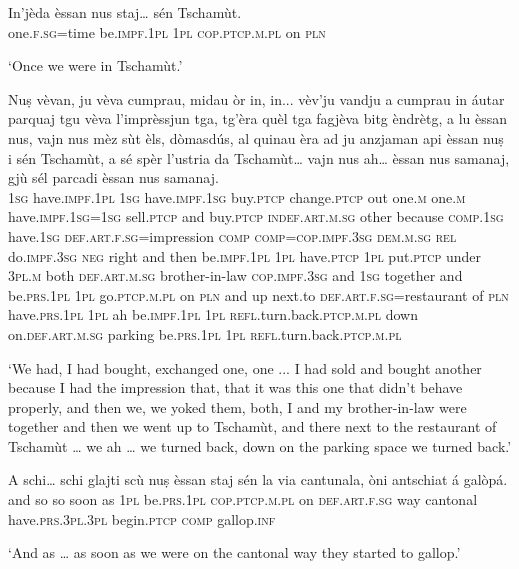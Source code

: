 \begin{linenumbers}
\gll   In’jèda èssan nus staj… sén Tschamùt. \\
 one.\textsc{f.sg=}time be.\textsc{impf.1pl} \textsc{1pl} \textsc{cop.ptcp.m.pl} on \textsc{pln} \\
\end{linenumbers}
\medskip
\glt `Once we were in Tschamùt.'
\medskip

\begin{linenumbers}
\gll Nuṣ vèvan, ju vèva cumprau, midau òr in, in... vèv’ju vandju a cumprau in áutar parquaj tgu vèva l’imprèssjun tga, tg’èra quèl tga fagjèva bitg èndrètg, a lu èssan nus, vajn nus mèz sùt èls, dòmasdús, al quinau èra ad ju anzjaman api èssan nuṣ i sén Tschamùt, a sé spèr l’ustria da Tschamùt… vajn nus ah… èssan nus samanaj, gjù sél parcadi èssan nus samanaj.\\
 \textsc{1sg} have.\textsc{impf.1pl} \textsc{1sg} have.\textsc{impf.1sg}  buy.\textsc{ptcp} change.\textsc{ptcp} out one.\textsc{m} one.\textsc{m} have.\textsc{impf.1sg=1sg} sell.\textsc{ptcp} and buy.\textsc{ptcp} \textsc{indef.art.m.sg} other because  \textsc{comp.1sg} have.\textsc{1sg} \textsc{def.art.f.sg}=impression \textsc{comp}  \textsc{comp=cop.impf.3sg} \textsc{dem.m.sg} \textsc{rel} do.\textsc{impf.3sg} \textsc{neg} right and then be.\textsc{impf.1pl} \textsc{1pl} have.\textsc{ptcp}  \textsc{1pl} put.\textsc{ptcp} under \textsc{3pl.m} both \textsc{def.art.m.sg} brother-in-law  \textsc{cop.impf.3sg} and \textsc{1sg} together and be.\textsc{prs.1pl} \textsc{1pl} go.\textsc{ptcp.m.pl} on \textsc{pln} and up next.to \textsc{def.art.f.sg=}restaurant of \textsc{pln}   have.\textsc{prs.1pl} \textsc{1pl} ah  be.\textsc{impf.1pl} \textsc{1pl} \textsc{refl.}turn.back.\textsc{ptcp.m.pl} down on.\textsc{def.art.m.sg} parking be.\textsc{prs.1pl} \textsc{1pl} \textsc{refl.}turn.back.\textsc{ptcp.m.pl}    \\
\end{linenumbers}
\medskip
\glt `We had, I had bought, exchanged one, one ... I had sold and bought another because I had the impression that, that it was this one that didn’t behave properly, and then we, we yoked them, both, I and my brother-in-law were together and then we went up to Tschamùt, and there next to the restaurant of Tschamùt … we ah … we turned back, down on the parking space we turned back.'
\medskip

\begin{linenumbers}
\gll  A schi… schi glajti scù nuṣ èssan staj sén la via cantunala, òni antschiat á galòpá.  \\
and so so soon as \textsc{1pl} be.\textsc{prs.1pl} \textsc{cop.ptcp.m.pl} on \textsc{def.art.f.sg} way cantonal  have.\textsc{prs.3pl.3pl} begin.\textsc{ptcp} \textsc{comp} gallop.\textsc{inf}   \\
\end{linenumbers}
\medskip
\glt `And as … as soon as we were on the cantonal way they started to gallop.'
\medskip

